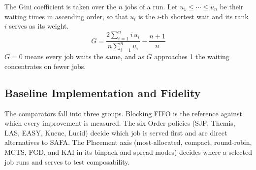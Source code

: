 \documentclass{ieeetj}
\begin{document}
The Gini coefficient is taken over the $n$ jobs of a run. Let $u_1\le\cdots\le u_n$ be their waiting times in ascending order, so that $u_i$ is the $i$-th shortest wait and its rank $i$ serves as its weight.
\begin{equation}
G = \frac{2\sum_{i=1}^{n} i\,u_i}{n\sum_{i=1}^{n} u_i} - \frac{n+1}{n}
\label{eq:gini}
\end{equation}
$G=0$ means every job waits the same, and as $G$ approaches 1 the waiting concentrates on fewer jobs.

\subsection{Baseline Implementation and Fidelity}\label{eval:impl}
The comparators fall into three groups. Blocking FIFO is the reference against which every improvement is measured. The six Order policies (SJF, Themis, LAS, EASY, Kueue, Lucid) decide which job is served first and are direct alternatives to SAFA. The Placement axis (most-allocated, compact, round-robin, MCTS, FGD, and KAI in its binpack and spread modes) decides where a selected job runs and serves to test composability.
\end{document}

